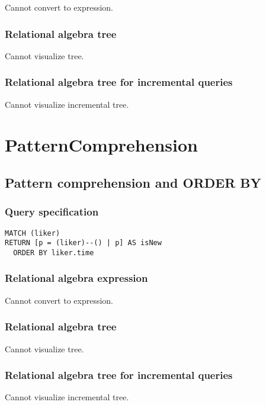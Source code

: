 Cannot convert to expression.

\subsubsection*{Relational algebra tree}

Cannot visualize tree.

\subsubsection*{Relational algebra tree for incremental queries}

Cannot visualize incremental tree.

\section{PatternComprehension}

\subsection{Pattern comprehension and ORDER BY}

\subsubsection*{Query specification}

\begin{lstlisting}
MATCH (liker)
RETURN [p = (liker)--() | p] AS isNew
  ORDER BY liker.time
\end{lstlisting}

\subsubsection*{Relational algebra expression}

Cannot convert to expression.

\subsubsection*{Relational algebra tree}

Cannot visualize tree.

\subsubsection*{Relational algebra tree for incremental queries}

Cannot visualize incremental tree.

